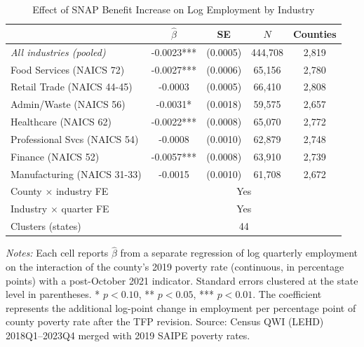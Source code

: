 \begin{table}[H]
\centering
\caption{Effect of SNAP Benefit Increase on Log Employment by Industry}
\label{tab:main}
\begin{threeparttable}
\begin{tabular}{lcccc}
\toprule
 & \multicolumn{1}{c}{$\hat{\beta}$} & \multicolumn{1}{c}{SE} & \multicolumn{1}{c}{$N$} & \multicolumn{1}{c}{Counties} \\
\midrule
\textit{All industries (pooled)} & -0.0023*** & (0.0005) & 444,708 & 2,819 \\
\midrule
Food Services (NAICS 72) & -0.0027*** & (0.0006) & 65,156 & 2,780 \\
Retail Trade (NAICS 44-45) & -0.0003 & (0.0005) & 66,410 & 2,808 \\
Admin/Waste (NAICS 56) & -0.0031* & (0.0018) & 59,575 & 2,657 \\
Healthcare (NAICS 62) & -0.0022*** & (0.0008) & 65,070 & 2,772 \\
Professional Svcs (NAICS 54) & -0.0008 & (0.0010) & 62,879 & 2,748 \\
Finance (NAICS 52) & -0.0057*** & (0.0008) & 63,910 & 2,739 \\
Manufacturing (NAICS 31-33) & -0.0015 & (0.0010) & 61,708 & 2,672 \\
\midrule
County $\times$ industry FE & \multicolumn{4}{c}{Yes} \\
Industry $\times$ quarter FE & \multicolumn{4}{c}{Yes} \\
Clusters (states) & \multicolumn{4}{c}{44} \\
\bottomrule
\end{tabular}
\begin{tablenotes}[flushleft]
\small
\item \textit{Notes:} Each cell reports $\hat{\beta}$ from a separate regression of log quarterly employment on the interaction of the county's 2019 poverty rate (continuous, in percentage points) with a post-October 2021 indicator. Standard errors clustered at the state level in parentheses. * $p<0.10$, ** $p<0.05$, *** $p<0.01$. The coefficient represents the additional log-point change in employment per percentage point of county poverty rate after the TFP revision. Source: Census QWI (LEHD) 2018Q1--2023Q4 merged with 2019 SAIPE poverty rates.
\end{tablenotes}
\end{threeparttable}
\end{table}
